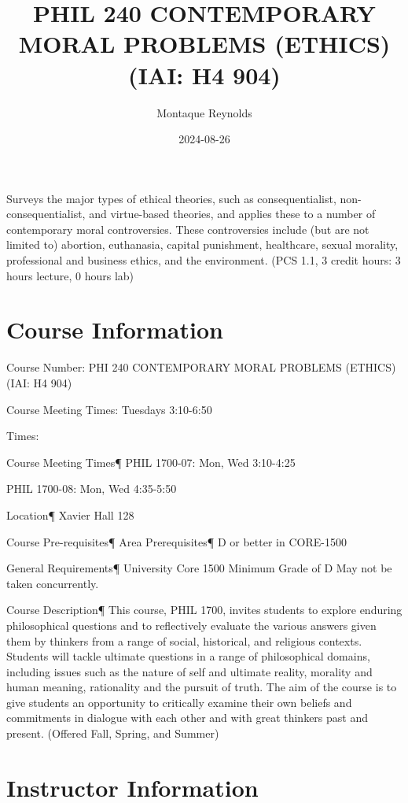 \documentclass[]{tufte-handout}
\title{PHIL 240 CONTEMPORARY MORAL PROBLEMS (ETHICS) (IAI: H4 904)}
\author{Montaque Reynolds}
\date{2024-08-26}
\begin{document}
\maketitle



{
\setcounter{tocdepth}{2}
\tableofcontents
}

Surveys the major types of ethical theories, such as consequentialist, non-consequentialist, and virtue-based theories, and applies these to a number of contemporary moral controversies. These
controversies include (but are not limited to) abortion, euthanasia, capital punishment, healthcare, sexual morality, professional and business ethics, and the environment. (PCS 1.1, 3 credit hours: 3 hours lecture, 0 hours lab)

\hypertarget{course-information}{%
\section{Course Information}\label{course-information}}

Course Number: PHI 240 CONTEMPORARY MORAL PROBLEMS (ETHICS) (IAI: H4 904)

Course Meeting Times: Tuesdays 3:10-6:50

Times:

Course Meeting Times¶
PHIL 1700-07: Mon, Wed 3:10-4:25

PHIL 1700-08: Mon, Wed 4:35-5:50

Location¶
Xavier Hall 128

Course Pre-requisites¶
Area Prerequisites¶
D or better in CORE-1500

General Requirements¶
University Core 1500 Minimum Grade of D May not be taken concurrently.

Course Description¶
This course, PHIL 1700, invites students to explore enduring philosophical questions and to reflectively evaluate the various answers given them by thinkers from a range of social, historical, and religious contexts. Students will tackle ultimate questions in a range of philosophical domains, including issues such as the nature of self and ultimate reality, morality and human meaning, rationality and the pursuit of truth. The aim of the course is to give students an opportunity to critically examine their own beliefs and commitments in dialogue with each other and with great thinkers past and present. (Offered Fall, Spring, and Summer)

\hypertarget{instructor-information}{%
\section{Instructor Information}\label{instructor-information}}
\end{document}
